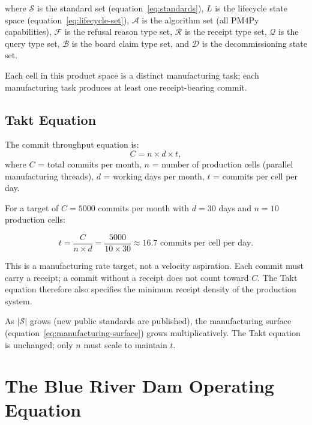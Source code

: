 where $\mathcal{S}$ is the standard set (equation~\ref{eq:standards}),
$L$ is the lifecycle state space (equation~\ref{eq:lifecycle-set}),
$\mathcal{A}$ is the algorithm set (all PM4Py capabilities), $\mathcal{F}$
is the refusal reason type set, $\mathcal{R}$ is the receipt type set,
$\mathcal{Q}$ is the query type set, $\mathcal{B}$ is the board claim type
set, and $\mathcal{D}$ is the decommissioning state set.

Each cell in this product space is a distinct manufacturing task; each
manufacturing task produces at least one receipt-bearing commit.

\subsection{Takt Equation}

\begin{definition}
\label{def:takt}
The commit throughput equation is:
\[
  C = n \times d \times t,
\]
where $C$ = total commits per month, $n$ = number of production cells (parallel
manufacturing threads), $d$ = working days per month, $t$ = commits per cell
per day.
\end{definition}

For a target of $C = 5000$ commits per month with $d = 30$ days and
$n = 10$ production cells:

\[
  t = \frac{C}{n \times d} = \frac{5000}{10 \times 30} \approx 16.7
  \text{ commits per cell per day.}
\]

This is a manufacturing rate target, not a velocity aspiration. Each commit
must carry a receipt; a commit without a receipt does not count toward $C$.
The Takt equation therefore also specifies the minimum receipt density of the
production system.

\begin{proposition}
\label{prop:surface-scalability}
As $|\mathcal{S}|$ grows (new public standards are published), the
manufacturing surface (equation~\ref{eq:manufacturing-surface}) grows
multiplicatively. The Takt equation is unchanged; only $n$ must scale to
maintain $t$.
\end{proposition}

\section{The Blue River Dam Operating Equation}
\label{sec:pi-brd}

